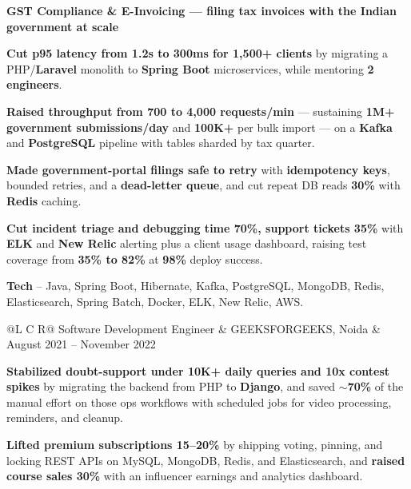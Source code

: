 \textcolor{Project}{\textbf{GST Compliance \& E-Invoicing --- filing tax invoices with the Indian government at scale}}
\vspace{-0.6ex}
\begin{zitemize}
    \item \textbf{Cut p95 latency from 1.2s to 300ms for 1,500+ clients} by migrating a PHP/\textbf{Laravel} monolith to \textbf{Spring Boot} microservices, while mentoring \textbf{2 engineers}.
    \item \textbf{Raised throughput from 700 to 4,000 requests/min} --- sustaining \textbf{1M+ government submissions/day} and \textbf{100K+} per bulk import --- on a \textbf{Kafka} and \textbf{PostgreSQL} pipeline with tables sharded by tax quarter.
    \item \textbf{Made government-portal filings safe to retry} with \textbf{idempotency keys}, bounded retries, and a \textbf{dead-letter queue}, and cut repeat DB reads \textbf{30\%} with \textbf{Redis} caching.
    \item \textbf{Cut incident triage and debugging time 70\%, support tickets 35\%} with \textbf{ELK} and \textbf{New Relic} alerting plus a client usage dashboard, raising test coverage from \textbf{35\% to 82\%} at \textbf{98\%} deploy success.
    \item \textbf{Tech} -- Java, Spring Boot, Hibernate, Kafka, PostgreSQL, MongoDB, Redis, Elasticsearch, Spring Batch, Docker, ELK, New Relic, AWS.
\end{zitemize}

\vspace{0.6ex}
\noindent
\begin{tabularx}{\textwidth}{@{}L C R@{}}
\textcolor{role}{Software Development Engineer} & \textcolor{company}{GEEKSFORGEEKS, Noida} & \textcolor{date}{August 2021 -- November 2022}\\
\end{tabularx}
\vspace{-2.4ex}
\begin{zitemize}
    \item \textbf{Stabilized doubt-support under 10K+ daily queries and 10x contest spikes} by migrating the backend from PHP to \textbf{Django}, and saved $\sim$\textbf{70\%} of the manual effort on those ops workflows with scheduled jobs for video processing, reminders, and cleanup.
    \item \textbf{Lifted premium subscriptions 15--20\%} by shipping voting, pinning, and locking REST APIs on MySQL, MongoDB, Redis, and Elasticsearch, and \textbf{raised course sales 30\%} with an influencer earnings and analytics dashboard.
\end{zitemize}
